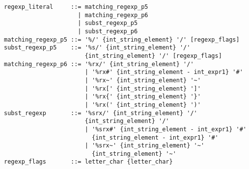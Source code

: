 \syntax\begin{lstlisting}
regexp_literal     ::= matching_regexp_p5
                     | matching_regexp_p6
                     | subst_regexp_p5
                     | subst_regexp_p6
matching_regexp_p5 ::= '%/' {int_string_element} '/' [regexp_flags]
subst_regexp_p5    ::= '%s/' {int_string_element} '/' 
                       {int_string_element} '/' [regexp_flags]
matching_regexp_p6 ::= '%rx/' {int_string_element} '/'
	                   | '%rx#' {int_string_element - int_expr1} '#'
	                   | '%rx~' {int_string_element} '~'
	                   | '%rx[' {int_string_element} ']'
	                   | '%rx{' {int_string_element} '}'
	                   | '%rx(' {int_string_element} ')'
subst_regexp       ::= '%srx/' {int_string_element} '/'
                       {int_string_element} '/'
	                   | '%srx#' {int_string_element - int_expr1} '#'
	                     {int_string_element - int_expr1} '#'
	                   | '%srx~' {int_string_element} '~'
	                     {int_string_element} '~'
regexp_flags       ::= letter_char {letter_char}
\end{lstlisting}













